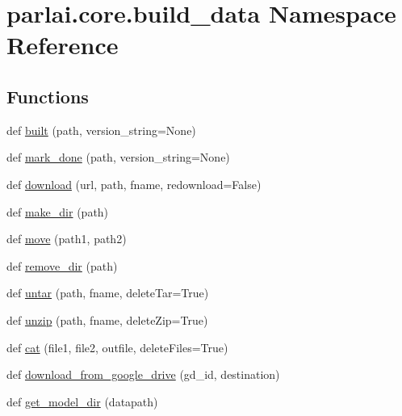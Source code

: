 \hypertarget{namespaceparlai_1_1core_1_1build__data}{}\section{parlai.\+core.\+build\+\_\+data Namespace Reference}
\label{namespaceparlai_1_1core_1_1build__data}
\subsection*{Functions}
\begin{DoxyCompactItemize}
\item 
def \hyperlink{namespaceparlai_1_1core_1_1build__data_ad834e1a9be02e18a6c2de2b03b9a8f10}{built} (path, version\+\_\+string=None)
\item 
def \hyperlink{namespaceparlai_1_1core_1_1build__data_a2527e6d29b0ccb7b841182890ac36a59}{mark\+\_\+done} (path, version\+\_\+string=None)
\item 
def \hyperlink{namespaceparlai_1_1core_1_1build__data_ab74f0e428f05e5d91fa93c8afb367622}{download} (url, path, fname, redownload=False)
\item 
def \hyperlink{namespaceparlai_1_1core_1_1build__data_a6ce042fedd4194bd016845bbe7a8facf}{make\+\_\+dir} (path)
\item 
def \hyperlink{namespaceparlai_1_1core_1_1build__data_a1678b8a042eeb9d9c8e9de08f52e496b}{move} (path1, path2)
\item 
def \hyperlink{namespaceparlai_1_1core_1_1build__data_a24ab3b7e68e41adf774df058d330ff33}{remove\+\_\+dir} (path)
\item 
def \hyperlink{namespaceparlai_1_1core_1_1build__data_a4d33f97932682a8513904022d852f3cf}{untar} (path, fname, delete\+Tar=True)
\item 
def \hyperlink{namespaceparlai_1_1core_1_1build__data_a7cbfdf246ca40dc3ed9f8613deb14a00}{unzip} (path, fname, delete\+Zip=True)
\item 
def \hyperlink{namespaceparlai_1_1core_1_1build__data_adc4feba864e2a0d0663cdf6bf84afaf6}{cat} (file1, file2, outfile, delete\+Files=True)
\item 
def \hyperlink{namespaceparlai_1_1core_1_1build__data_ac9224da5c4e4ce9d1f4ab05e837c1f45}{download\+\_\+from\+\_\+google\+\_\+drive} (gd\+\_\+id, destination)
\item 
def \hyperlink{namespaceparlai_1_1core_1_1build__data_ad2fe6222094caae59f304931aee0952a}{get\+\_\+model\+\_\+dir} (datapath)
\item 

\end{DoxyCompactItemize}

